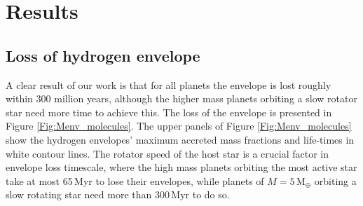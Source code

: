 \documentclass[bibyear,tradiabstract]{aa}
\begin{document}
\section{Results}
\subsection{Loss of hydrogen envelope}
A clear result of our work is that for all planets the envelope is lost roughly within 300 million years, although the higher mass planets orbiting a slow rotator star need more time to achieve this. The loss of the envelope is presented in Figure \ref{Fig:Menv_molecules}. The upper panels of Figure \ref{Fig:Menv_molecules} show the hydrogen envelopes' maximum accreted mass fractions and life-times in white contour lines. The rotator speed of the host star is a crucial factor in envelope l{o}ss timescale, where the high mass planets orbiting the most active star take at most 65\,Myr to lose their envelopes, while planets of $M=5$\,M$_{\oplus}$ orbiting a slow rotating star need more than 300\,Myr to do so.
\end{document}
